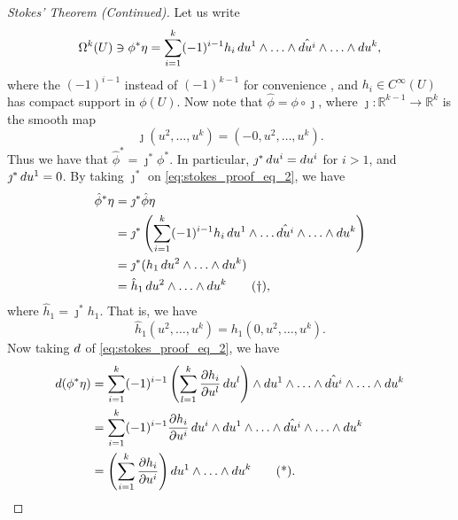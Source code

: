 \documentclass[notoc,notitlepage]{tufte-book}
\begin{document}
\begin{proof}[Stokes' Theorem (Continued)]
  Let us write
  \begin{equation}\label{eq:stokes_proof_eq_2}
    \Omega^k(U) \ni \phi^* \eta = \sum_{i=1}^{k} (-1)^{i-1} h_i \mathop{}\!d{u^1} \land
    \hdots \land \hat{\mathop{}\!d{u^i}} \land \hdots \land \mathop{}\!d{u^k},
  \end{equation}
  where the $(-1)^{i-1}$ instead of $(-1)^{k-1}$ for convenience
  , and
  $h_i \in C^\infty(U)$ has compact support in $\phi(U)$. Now note that
  $\hat{\phi} = \phi \circ \jmath$, where $\jmath : \mathbb{R}^{k-1} \to
  \mathbb{R}^k$ is the smooth map
  \begin{equation*}
    \jmath(u^2, \ldots, u^k) = (-0, u^2, \ldots, u^k).
  \end{equation*}
  Thus we have that $\hat{\phi}^* = \jmath^* \phi^*$. In particular, $\jmath^* \mathop{}\!d{u^i} =
  \mathop{}\!d{u^i}$ for $i > 1$, and $\jmath^* \mathop{}\!d{u^1} = 0$. By taking $\jmath^*$ on
  \cref{eq:stokes_proof_eq_2}, we have
  \begin{align*}
    \hat{\phi}^* \eta &= \jmath^* \hat{\phi} \eta \\
                      &= \jmath^* \left( \sum_{i=1}^{k} (-1)^{i-1} h_i \mathop{}\!d{u^1}
                      \land \hdots \hat{\mathop{}\!d{u^i}} \land \hdots \land \mathop{}\!d{u^k}
                        \right) \\
                      &= \jmath^*(h_1 \mathop{}\!d{u^2} \land \hdots \land \mathop{}\!d{u^k}) \\
                      &= \hat{h}_1 \mathop{}\!d{u^2} \land \hdots \land \mathop{}\!d{u^k}
                      \tag{$\dagger$}\label{eq:stokes_proof_eq_3},
  \end{align*}
  where $\hat{h}_1 = \jmath^* h_1$. That is, we have
  \begin{equation*}
    \hat{h}_1(u^2, \ldots, u^k) = h_1(0, u^2, \ldots, u^k).
  \end{equation*}
  Now taking $\mathop{}\!d{}$ of \cref{eq:stokes_proof_eq_2}, we have
  \begin{align*}
    \dif{(\phi^* \eta)}
    &= \sum_{i=1}^{k} (-1)^{i-1} \left( \sum_{l=1}^{k} \frac{\partial
      h_i}{\partial u^l} \dif{u^l} \right) \land \dif{u^1} \land \hdots \land
      \hat{\dif{u^i}} \land \hdots \land \dif{u^k} \\
    &= \sum_{i=1}^{k} (-1)^{i-1} \frac{\partial h_i}{\partial u^i} \dif{u^i}
      \land \dif{u^1} \land \hdots \land \hat{\dif{u^i}} \land \hdots \land
      \dif{u^k} \\
    &= \left( \sum_{i=1}^{k} \frac{\partial h_i}{\partial u^i} \right) \dif{u^1}
      \land \hdots \land \dif{u^k} \tag{*}\label{eq:stokes_proof_eq_4}.
  \end{align*}


\end{proof}
\end{document}
